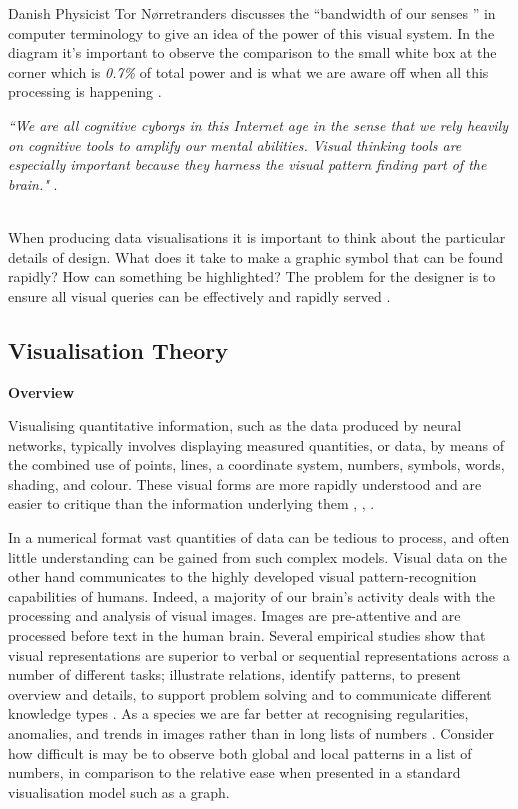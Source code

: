 \documentclass[a4paper,11pt,titlepage]{article}
\begin{document}
		\par 
		Danish Physicist Tor Nørretranders discusses the ``bandwidth of our senses ” in computer terminology to give an idea of the power of this visual system. In the diagram it's important to observe the comparison to the small white box at the corner which is \textit{0.7\%} of total power and is what we are aware off when all this processing is happening \cite{Tufte2012}.		
		\par 
		\textit{``We are all cognitive cyborgs in this Internet age in the sense that we rely heavily on cognitive tools to amplify our mental abilities. Visual thinking tools are especially important because they harness the visual pattern finding part of the brain."} \cite{Ware2010}.
\\\

		\par 
		When producing data visualisations it is important to think about the particular details of design. What does it take to make a graphic symbol that can be found rapidly? How can something be highlighted? The problem for the designer is to ensure all visual queries can be effectively and rapidly served \cite{Keim2002}. 

	\subsection{Visualisation Theory}
	\textbf{Overview}
\par
		Visualising quantitative information, such as the data produced by neural networks, typically involves displaying measured quantities, or data, by means of the combined use of points, lines, a coordinate system, numbers, symbols, words, shading, and colour. These visual forms are more rapidly understood and are easier to critique than the information underlying them \cite{DeFanti1989}, \cite{McCormick1987}, \cite{Tufte2001}.
		\par
		In a numerical format vast quantities of data can be tedious to process, and often little understanding can be gained from such complex models. Visual data on the other hand communicates to the highly developed visual pattern-recognition capabilities of humans. Indeed, a majority of our brain's activity deals with the processing and analysis of visual images. Images are pre-attentive and are processed before text in the human brain. Several empirical studies show that visual representations are superior to verbal or sequential representations across a number of different tasks; illustrate relations, identify patterns, to present overview and details, to support problem solving and to communicate different knowledge types \cite{Burkhard2004}. As a species we are far better at recognising regularities, anomalies, and trends in images rather than in long lists of numbers \cite{Ware2010}. Consider how difficult is may be to observe both global and local patterns in a list of numbers, in comparison to the relative ease when presented in a standard visualisation model such as a graph.
	  		 
\end{document}
